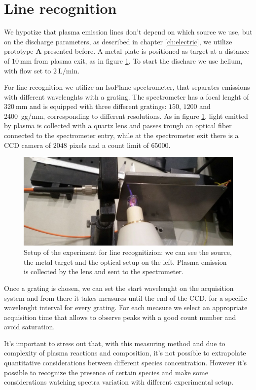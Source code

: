 \section{Line recognition}
We hypotize that plasma emission lines don't depend on which source we use, but on the discharge parameters, as described in chapter \ref{ch:electric}, we utilize prototype \textbf{A} presented before. A metal plate is positioned as target at a distance of $\SI{10}{\milli\meter}$ from plasma exit, as in figure \ref{fig:app1}. To start the dischare we use helium, with flow set to $\SI{2}{\liter/\minute}$.

For line recognition we utilize an IsoPlane spectrometer, that separates emissions with different wavelenghts with a grating. The spectrometer has a focal lenght of $\SI{320}{\milli\meter}$ and is equipped with three different gratings: $\num{150}$, $\num{1200}$ and \SI{2400}{gg/\milli\meter}, corresponding to different resolutions. %
As in figure \ref{fig:app1}, light emitted by plasma is collected with a quartz lens %
and passes trough an optical fiber %
connected to the spectrometer entry, while at the spectrometer exit there is a CCD camera of $2048$ pixels and a count limit of $\num{65000}$.
\begin{figure}
\centering
\includegraphics[width=.6\textwidth]{Images/Spectroscopy/apparato.jpg}
\caption{Setup of the experiment for line recognitizion: we can see the source, the metal target and the optical setup on the left. Plasma emission is collected by the lens and sent to the spectrometer.}
\label{fig:app1}
\end{figure}

Once a grating is chosen, we can set the start wavelenght on the acquisition system and from there it takes measures until the end of the CCD, for a specific wavelenght interval for every grating.
For each measure we select an appropriate acquisition time that allows to observe peaks with a good count number and avoid saturation.

It's important to stress out that, with this measuring method and due to complexity of plasma reactions and composition, it's not possible to extrapolate quantitative considerations between different species concentration. However it's possible to recognize the presence of certain species and make some considerations watching spectra variation with different experimental setup.


